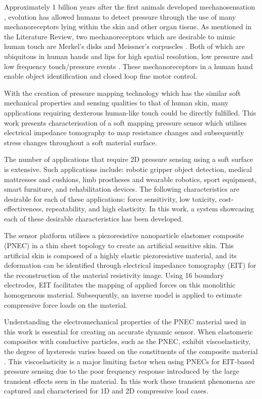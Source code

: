 Approximately 1 billion years after the first animals developed mechanosensation \citep{Parfrey2011}, evolution has allowed humans to detect pressure through the use of many mechanoreceptors lying within the skin and other organ tissue. As mentioned in the Literature Review, two mechanoreceptors which are desirable to mimic human touch are Merkel's disks and Meissner's corpuscles \citep{Kamkim2008}. Both of which are ubiquitous in human hands and lips for high spatial resolution, low pressure and low frequency touch/pressure events \citep{Molnar2015}. These mechanoreceptors in a human hand enable object identification and closed loop fine motor control. 

With the creation of pressure mapping technology which has the similar soft mechanical properties and sensing qualities to that of human skin, many applications requiring dexterous human-like touch could be directly fulfilled. This work presents characterisation of a soft mapping pressure sensor which utilises electrical impedance tomography to map resistance changes and subsequently stress changes throughout a soft material surface. 

The number of applications that require 2D pressure sensing using a soft surface is extensive. Such applications include: robotic gripper object detection, medical mattresses and cushions, limb prostheses and wearable robotics, sport equipment, smart furniture, and rehabilitation devices. The following characteristics are desirable for each of these applications: force sensitivity, low toxicity, cost-effectiveness, repeatability, and high elasticity. In this work, a system showcasing each of these desirable characteristics has been developed. 

The sensor platform utilises a piezoresistive nanoparticle elastomer composite (PNEC) in a thin sheet topology to create an artificial sensitive skin. This artificial skin is composed of a highly elastic piezoresistive material, and its deformation can be identified through electrical impedance tomography (EIT) for the reconstruction of the material resistivity image. Using 16 boundary electrodes, EIT facilitates the mapping of applied forces on this monolithic homogeneous material. Subsequently, an inverse model is applied to estimate compressive force loads on the material.

Understanding the electromechanical properties of the PNEC material used in this work is essential for creating an accurate dynamic sensor. When elastomeric composites with conductive particles, such as the PNEC, exhibit viscoelasticity, the degree of hysteresis varies based on the constituents of the composite material \citep{Ellingham2021}. This viscoelasticity is a major limiting factor when using PNECs for EIT-based pressure sensing due to the poor frequency response introduced by the large transient effects seen in the material. In this work these transient phenomena are captured and characterised for 1D and 2D compressive load cases.

